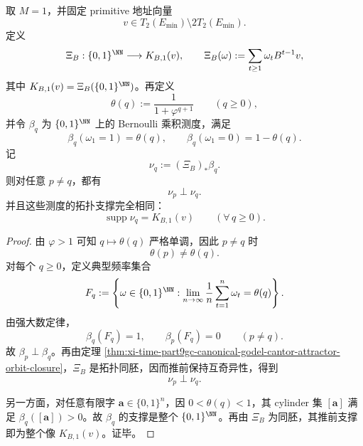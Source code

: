 \begin{theorem}\label{thm:conclusion-binary-godel-logistic-common-support-singularity}
取 \(M=1\)，并固定 primitive 地址向量
\[
v\in T_2(E_{\min})\setminus 2T_2(E_{\min}).
\]
定义
\[
\Xi_B:\{0,1\}^{\NN}\longrightarrow K_{B,1}(v),
\qquad
\Xi_B(\omega):=\sum_{t\ge 1}\omega_t B^{t-1}v,
\]
其中 \(K_{B,1}(v)=\Xi_B(\{0,1\}^{\NN})\)。再定义
\[
\theta(q):=\frac{1}{1+\varphi^{q+1}}
\qquad(q\ge 0),
\]
并令 \(\beta_q\) 为 \(\{0,1\}^{\NN}\) 上的 Bernoulli 乘积测度，满足
\[
\beta_q(\omega_1=1)=\theta(q),
\qquad
\beta_q(\omega_1=0)=1-\theta(q).
\]
记
\[
\nu_q:=(\Xi_B)_*\beta_q.
\]
则对任意 \(p\neq q\)，都有
\[
\boxed{\;
\nu_p\perp \nu_q.\;}
\]
并且这些测度的拓扑支撑完全相同：
\[
\boxed{\;
\operatorname{supp}\nu_q=K_{B,1}(v)
\qquad(\forall\,q\ge 0).\;}
\]
\end{theorem}
\begin{proof}
由 \(\varphi>1\) 可知 \(q\mapsto \theta(q)\) 严格单调，因此 \(p\neq q\) 时
\[
\theta(p)\neq \theta(q).
\]
对每个 \(q\ge 0\)，定义典型频率集合
\[
F_q:=
\left\{
\omega\in\{0,1\}^{\NN}:
\lim_{n\to\infty}\frac{1}{n}\sum_{t=1}^{n}\omega_t=\theta(q)
\right\}.
\]
由强大数定律，
\[
\beta_q(F_q)=1,
\qquad
\beta_p(F_q)=0
\qquad(p\neq q).
\]
故 \(\beta_p\perp \beta_q\)。再由定理 \ref{thm:xi-time-part9gc-canonical-godel-cantor-attractor-orbit-closure}，\(\Xi_B\) 是拓扑同胚，因而推前保持互奇异性，得到
\[
\nu_p\perp \nu_q.
\]

另一方面，对任意有限字 \(\mathbf a\in\{0,1\}^n\)，因 \(0<\theta(q)<1\)，其 cylinder 集 \([\mathbf a]\) 满足 \(\beta_q([\mathbf a])>0\)。故 \(\beta_q\) 的支撑是整个 \(\{0,1\}^{\NN}\)。再由 \(\Xi_B\) 为同胚，其推前支撑即为整个像 \(K_{B,1}(v)\)。证毕。
\end{proof}

